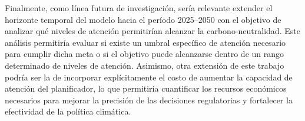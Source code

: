 Finalmente, como línea futura de investigación, sería relevante extender el horizonte temporal del modelo hacia el período 2025--2050 con el objetivo de analizar qué niveles de atención permitirían alcanzar la carbono-neutralidad. Este análisis permitiría evaluar si existe un umbral específico de atención necesario para cumplir dicha meta o si el objetivo puede alcanzarse dentro de un rango determinado de niveles de atención. Asimismo, otra extensión de este trabajo podría ser la de incorporar explícitamente el costo de aumentar la capacidad de atención del planificador, lo que permitiría cuantificar los recursos económicos necesarios para mejorar la precisión de las decisiones regulatorias y fortalecer la efectividad de la política climática.









